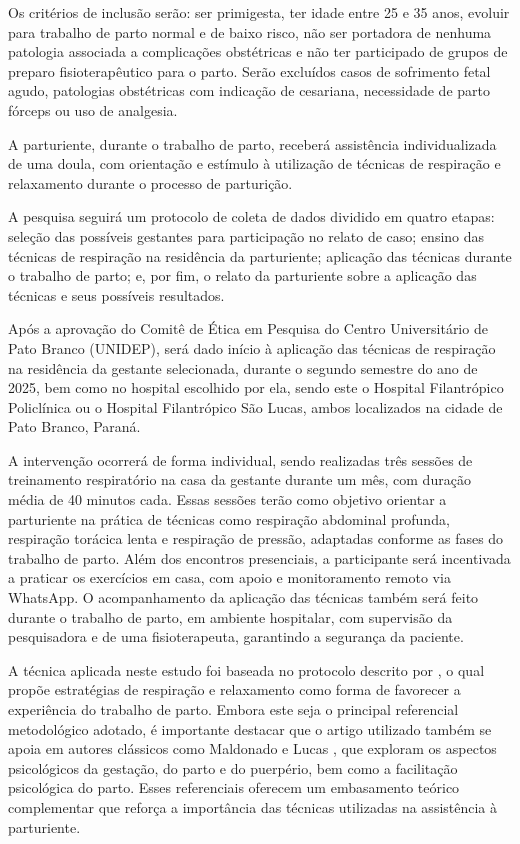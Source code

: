\documentclass[openright]{normas-utf-tex}
\begin{document}
Os critérios de inclusão serão: ser primigesta, ter idade entre 25 e 35 anos, evoluir para trabalho de parto normal e de baixo risco, não ser portadora de nenhuma patologia associada a complicações obstétricas e não ter participado de grupos de preparo fisioterapêutico para o parto. Serão excluídos casos de sofrimento fetal agudo, patologias obstétricas com indicação de cesariana, necessidade de parto fórceps ou uso de analgesia.

A parturiente, durante o trabalho de parto, receberá assistência individualizada de uma doula, com orientação e estímulo à utilização de técnicas de respiração e relaxamento durante o processo de parturição.

A pesquisa seguirá um protocolo de coleta de dados dividido em quatro etapas: seleção das possíveis gestantes para participação no relato de caso; ensino das técnicas de respiração na residência da parturiente; aplicação das técnicas durante o trabalho de parto; e, por fim, o relato da parturiente sobre a aplicação das técnicas e seus possíveis resultados.

Após a aprovação do Comitê de Ética em Pesquisa do Centro Universitário de Pato Branco (UNIDEP), será dado início à aplicação das técnicas de respiração na residência da gestante selecionada, durante o segundo semestre do ano de 2025, bem como no hospital escolhido por ela, sendo este o Hospital Filantrópico Policlínica ou o Hospital Filantrópico São Lucas, ambos localizados na cidade de Pato Branco, Paraná.

A intervenção ocorrerá de forma individual, sendo realizadas três sessões de treinamento respiratório na casa da gestante durante um mês, com duração média de 40 minutos cada. Essas sessões terão como objetivo orientar a parturiente na prática de técnicas como respiração abdominal profunda, respiração torácica lenta e respiração de pressão, adaptadas conforme as fases do trabalho de parto. Além dos encontros presenciais, a participante será incentivada a praticar os exercícios em casa, com apoio e monitoramento remoto via WhatsApp. O acompanhamento da aplicação das técnicas também será feito durante o trabalho de parto, em ambiente hospitalar, com supervisão da pesquisadora e de uma fisioterapeuta, garantindo a segurança da paciente.

A técnica aplicada neste estudo foi baseada no protocolo descrito por , o qual propõe estratégias de respiração e relaxamento como forma de favorecer a experiência do trabalho de parto. Embora este seja o principal referencial metodológico adotado, é importante destacar que o artigo utilizado também se apoia em autores clássicos como Maldonado \citeyear{maldonado1991} e Lucas \citeyear{lucas1983}, que exploram os aspectos psicológicos da gestação, do parto e do puerpério, bem como a facilitação psicológica do parto. Esses referenciais oferecem um embasamento teórico complementar que reforça a importância das técnicas utilizadas na assistência à parturiente.
\end{document}
